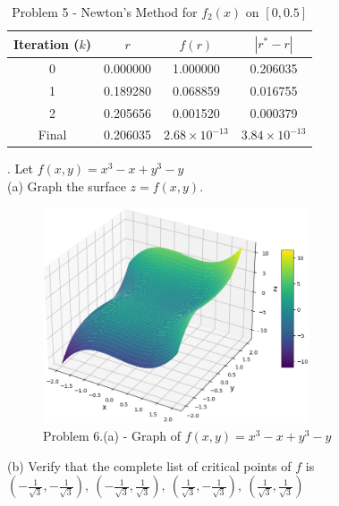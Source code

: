 \documentclass{article} %
\begin{document}
{        \vspace{1em}

        \begin{table}[h!]
        \centering
        \begin{tabular}{cccc}
        \toprule
        Iteration ($k$) & $r$ & $f(r)$ & $|r^* - r|$ \\
        \midrule
        0 & 0.000000 & 1.000000 & 0.206035 \\
        1 & 0.189280 & 0.068859 & 0.016755 \\
        2 & 0.205656 & 0.001520 & 0.000379 \\
        Final & 0.206035 & $2.68 \times 10^{-13}$ & $3.84 \times 10^{-13}$ \\
        \bottomrule
        \end{tabular}
        \caption{Problem 5 - Newton's Method for $f_2(x)$ on $[0, 0.5]$}
        \label{tab:newton_f2}
    \end{table}

    . Let $ f(x, y) = x^3 - x + y^3 - y $ \\
    (a) Graph the surface $ z = f(x, y) $. \\

    \begin{figure}[h!]
    \centering
    \includegraphics[width=0.7\textwidth]{generated_image3.png}
    \caption{Problem 6.(a) - Graph of $f(x, y) = x^3 - x + y^3 - y$}
    \label{fig4}
    \end{figure}

    \noindent (b) Verify that the complete list of critical points of $ f $ is
    \( %
    \left(-\frac{1}{\sqrt{3}}, -\frac{1}{\sqrt{3}}\right),\ %
    \left(-\frac{1}{\sqrt{3}}, \frac{1}{\sqrt{3}}\right),\ 
    \left(\frac{1}{\sqrt{3}}, -\frac{1}{\sqrt{3}}\right),\ 
    \left(\frac{1}{\sqrt{3}}, \frac{1}{\sqrt{3}}\right)
    \)

}
\end{document}

